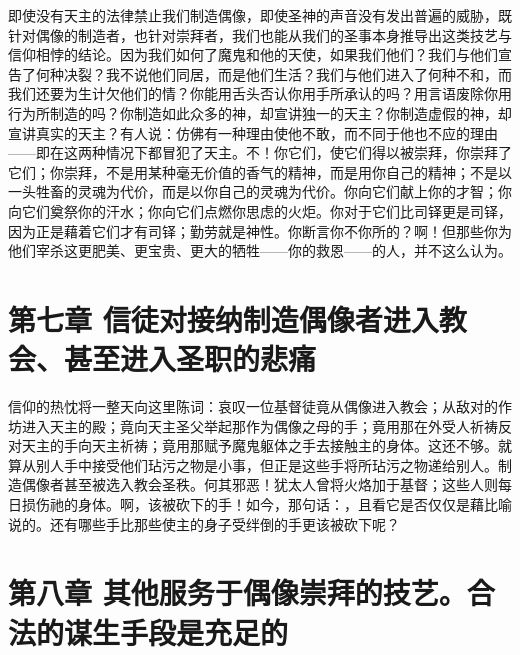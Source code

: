 即使没有天主的法律禁止我们制造偶像，即使圣神的声音没有发出普遍的威胁，既针对偶像的制造者，也针对崇拜者，我们也能从我们的圣事本身推导出这类技艺与信仰相悖的结论。因为我们如何了魔鬼和他的天使，如果我们他们？我们与他们宣告了何种决裂？我不说他们同居，而是他们生活？我们与他们进入了何种不和，而我们还要为生计欠他们的情？你能用舌头否认你用手所承认的吗？用言语废除你用行为所制造的吗？你制造如此众多的神，却宣讲独一的天主？你制造虚假的神，却宣讲真实的天主？有人说：仿佛有一种理由使他不敢，而不同于他也不应的理由——即在这两种情况下都冒犯了天主。不！你它们，使它们得以被崇拜，你崇拜了它们；你崇拜，不是用某种毫无价值的香气的精神，而是用你自己的精神；不是以一头牲畜的灵魂为代价，而是以你自己的灵魂为代价。你向它们献上你的才智；你向它们奠祭你的汗水；你向它们点燃你思虑的火炬。你对于它们比司铎更是司铎，因为正是藉着它们才有司铎；勤劳就是神性。你断言你不你所的？啊！但那些你为他们宰杀这更肥美、更宝贵、更大的牺牲——你的救恩——的人，并不这么认为。\par


\section{第七章 信徒对接纳制造偶像者进入教会、甚至进入圣职的悲痛}

信仰的热忱将一整天向这里陈词：哀叹一位基督徒竟从偶像进入教会；从敌对的作坊进入天主的殿；竟向天主圣父举起那作为偶像之母的手；竟用那在外受人祈祷反对天主的手向天主祈祷；竟用那赋予魔鬼躯体之手去接触主的身体。这还不够。就算从别人手中接受他们玷污之物是小事，但正是这些手将所玷污之物递给别人。制造偶像者甚至被选入教会圣秩。何其邪恶！犹太人曾将火烙加于基督；这些人则每日损伤祂的身体。啊，该被砍下的手！如今，那句话：，且看它是否仅仅是藉比喻说的。还有哪些手比那些使主的身子受绊倒的手更该被砍下呢？\par


\section{第八章 其他服务于偶像崇拜的技艺。合法的谋生手段是充足的}

